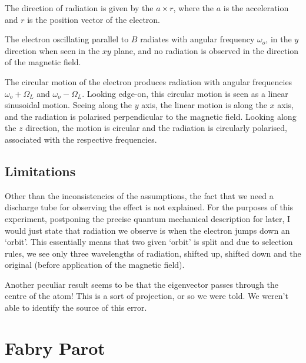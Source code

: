 The direction of radiation is given by the $a\times r$, where the
$a$ is the acceleration and $r$ is the position vector of the electron. 

The electron oscillating parallel to $B$ radiates with angular frequency
$\omega_{o}$, in the $y$ direction when seen in the $xy$ plane,
and no radiation is observed in the direction of the magnetic field.

The circular motion of the electron produces radiation with angular
frequencies $\omega_{o}+\Omega_{L}$ and $\omega_{o}-\Omega_{L}$.
Looking edge-on, this circular motion is seen as a linear sinusoidal
motion. Seeing along the $y$ axis, the linear motion is along the
$x$ axis, and the radiation is polarised perpendicular to the magnetic
field. Looking along the $z$ direction, the motion is circular and
the radiation is circularly polarised, associated with the respective
frequencies.


\subsection{Limitations}

Other than the inconsistencies of the assumptions, the fact that we
need a discharge tube for observing the effect is not explained. For
the purposes of this experiment, postponing the precise quantum mechanical
description for later, I would just state that radiation we observe
is when the electron jumps down an `orbit'. This essentially means
that two given `orbit' is split and due to selection rules, we see
only three wavelengths of radiation, shifted up, shifted down and
the original (before application of the magnetic field).

Another peculiar result seems to be that the eigenvector passes through
the centre of the atom! This is a sort of projection, or so we were
told. We weren't able to identify the source of this error.


\section{Fabry Parot}

